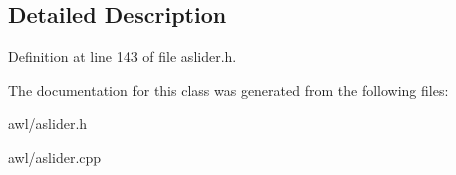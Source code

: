 \subsection{Detailed Description}


Definition at line 143 of file aslider.\+h.



The documentation for this class was generated from the following files\+:\begin{DoxyCompactItemize}
\item 
awl/aslider.\+h\item 
awl/aslider.\+cpp\end{DoxyCompactItemize}
